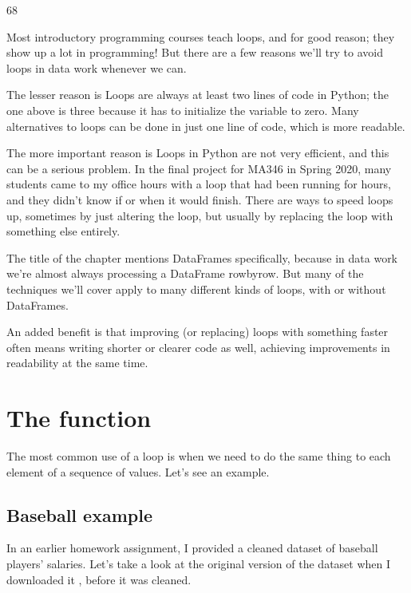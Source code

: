 \documentclass[letterpaper,10pt,english]{sphinxmanual}
\begin{document}
\begin{sphinxVerbatim}[commandchars=\\\{\}]
68
\end{sphinxVerbatim}

Most introductory programming courses teach loops, and for good reason; they show up a lot in programming!  But there are a few reasons we’ll try to avoid loops in data work whenever we can.

The lesser reason is   Loops are always at least two lines of code in Python; the one above is three because it has to initialize the  variable to zero.  Many alternatives to loops can be done in just one line of code, which is more readable.

The more important reason is   Loops in Python are not very efficient, and this can be a serious problem.  In the final project for MA346 in Spring 2020, many students came to my office hours with a loop that had been running for hours, and they didn’t know if or when it would finish.  There are  ways to speed loops up, sometimes by just altering the loop, but usually by replacing the loop with something else entirely.


The title of the chapter mentions DataFrames specifically, because in data work we’re almost always processing a DataFrame row\sphinxhyphen{}by\sphinxhyphen{}row.  But many of the techniques we’ll cover apply to many different kinds of loops, with or without DataFrames.

An added benefit is that improving (or replacing) loops with something faster often means writing shorter or clearer code as well, achieving improvements in readability at the same time.


\section{The  function}
\label{\detokenize{chapter-11-processing-rows:the-apply-function}}
The most common use of a loop is when we need to do the same thing to each element of a sequence of values.  Let’s see an example.


\subsection{Baseball example}
\label{\detokenize{chapter-11-processing-rows:baseball-example}}
In an earlier homework assignment, I provided a cleaned dataset of baseball players’ salaries.  Let’s take a look at the original version of the dataset when I downloaded it , before it was cleaned.
\end{document}
